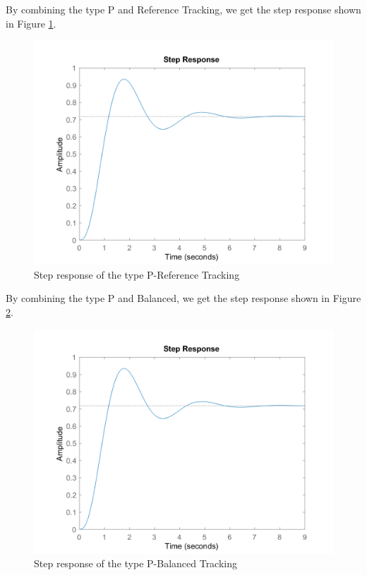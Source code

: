 \documentclass[a4paper, twocolumn, titlepage, 10pt]{article}
\begin{document}
   	By combining the type P and Reference Tracking, we get the step response shown in Figure \ref{p-track-step}.
   \begin{figure}[H]
   	\centering
   	\includegraphics[width=\linewidth]{p-track-step}
   	\caption{Step response of the type P-Reference Tracking}
   	\label{p-track-step} 
   \end{figure}
		   	By combining the type P and Balanced, we get the step response shown in Figure \ref{p-balance-step}. 
	\begin{figure}[H]
		\centering
		\includegraphics[width=\linewidth]{p-balance-step}
		\caption{Step response of the type P-Balanced Tracking}
		\label{p-balance-step} 
	\end{figure}
\end{document}
